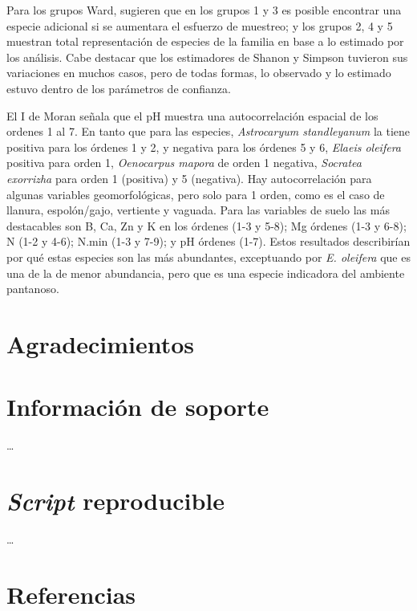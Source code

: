 \documentclass[11pt,]{article}
\begin{document}
Para los grupos Ward, sugieren que en los grupos 1 y 3 es posible
encontrar una especie adicional si se aumentara el esfuerzo de muestreo;
y los grupos 2, 4 y 5 muestran total representación de especies de la
familia en base a lo estimado por los análisis. Cabe destacar que los
estimadores de Shanon y Simpson tuvieron sus variaciones en muchos
casos, pero de todas formas, lo observado y lo estimado estuvo dentro de
los parámetros de confianza.

El I de Moran señala que el pH muestra una autocorrelación espacial de
los ordenes 1 al 7. En tanto que para las especies, \emph{Astrocaryum
standleyanum} la tiene positiva para los órdenes 1 y 2, y negativa para
los órdenes 5 y 6, \emph{Elaeis oleifera} positiva para orden 1,
\emph{Oenocarpus mapora} de orden 1 negativa, \emph{Socratea exorrizha}
para orden 1 (positiva) y 5 (negativa). Hay autocorrelación para algunas
variables geomorfológicas, pero solo para 1 orden, como es el caso de
llanura, espolón/gajo, vertiente y vaguada. Para las variables de suelo
las más destacables son B, Ca, Zn y K en los órdenes (1-3 y 5-8); Mg
órdenes (1-3 y 6-8); N (1-2 y 4-6); N.min (1-3 y 7-9); y pH órdenes
(1-7). Estos resultados describirían por qué estas especies son las más
abundantes, exceptuando por \emph{E. oleifera} que es una de la de menor
abundancia, pero que es una especie indicadora del ambiente pantanoso.

\section{Agradecimientos}\label{agradecimientos}

\section{Información de soporte}\label{informaciuxf3n-de-soporte}

\ldots

\section{\texorpdfstring{\emph{Script}
reproducible}{Script reproducible}}\label{script-reproducible}

\ldots

\section*{Referencias}\label{referencias}
\end{document}
